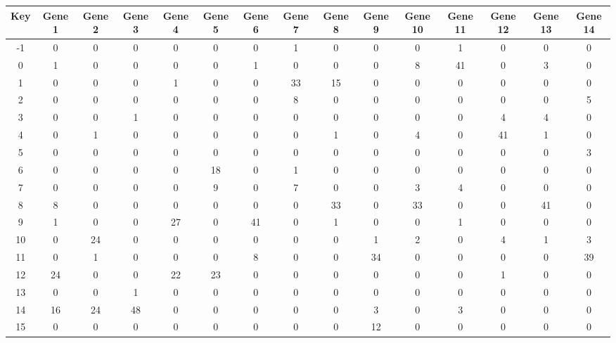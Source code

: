 \begin{tabular}{|c|c|c|c|c|c|c|c|c|c|c|c|c|c|c|}
\hline
Key & Gene 1 & Gene 2 & Gene 3 & Gene 4 & Gene 5 & Gene 6 & Gene 7 & Gene 8 & Gene 9 & Gene 10 & Gene 11 & Gene 12 & Gene 13 & Gene 14 \\
\hline
-1 & 0 & 0 & 0 & 0 & 0 & 0 & 1 & 0 & 0 & 0 & 1 & 0 & 0 & 0 \\
0 & 1 & 0 & 0 & 0 & 0 & 1 & 0 & 0 & 0 & 8 & 41 & 0 & 3 & 0 \\
1 & 0 & 0 & 0 & 1 & 0 & 0 & 33 & 15 & 0 & 0 & 0 & 0 & 0 & 0 \\
2 & 0 & 0 & 0 & 0 & 0 & 0 & 8 & 0 & 0 & 0 & 0 & 0 & 0 & 5 \\
3 & 0 & 0 & 1 & 0 & 0 & 0 & 0 & 0 & 0 & 0 & 0 & 4 & 4 & 0 \\
4 & 0 & 1 & 0 & 0 & 0 & 0 & 0 & 1 & 0 & 4 & 0 & 41 & 1 & 0 \\
5 & 0 & 0 & 0 & 0 & 0 & 0 & 0 & 0 & 0 & 0 & 0 & 0 & 0 & 3 \\
6 & 0 & 0 & 0 & 0 & 18 & 0 & 1 & 0 & 0 & 0 & 0 & 0 & 0 & 0 \\
7 & 0 & 0 & 0 & 0 & 9 & 0 & 7 & 0 & 0 & 3 & 4 & 0 & 0 & 0 \\
8 & 8 & 0 & 0 & 0 & 0 & 0 & 0 & 33 & 0 & 33 & 0 & 0 & 41 & 0 \\
9 & 1 & 0 & 0 & 27 & 0 & 41 & 0 & 1 & 0 & 0 & 1 & 0 & 0 & 0 \\
10 & 0 & 24 & 0 & 0 & 0 & 0 & 0 & 0 & 1 & 2 & 0 & 4 & 1 & 3 \\
11 & 0 & 1 & 0 & 0 & 0 & 8 & 0 & 0 & 34 & 0 & 0 & 0 & 0 & 39 \\
12 & 24 & 0 & 0 & 22 & 23 & 0 & 0 & 0 & 0 & 0 & 0 & 1 & 0 & 0 \\
13 & 0 & 0 & 1 & 0 & 0 & 0 & 0 & 0 & 0 & 0 & 0 & 0 & 0 & 0 \\
14 & 16 & 24 & 48 & 0 & 0 & 0 & 0 & 0 & 3 & 0 & 3 & 0 & 0 & 0 \\
15 & 0 & 0 & 0 & 0 & 0 & 0 & 0 & 0 & 12 & 0 & 0 & 0 & 0 & 0 \\
\hline
\end{tabular}